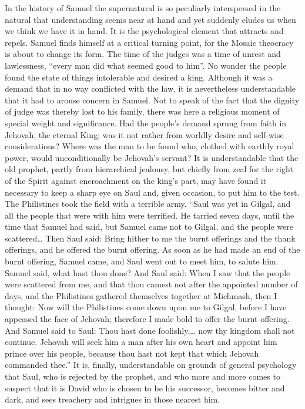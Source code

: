\documentclass[12pt,a4paper,openany]{book}
\newcommand{\opage}[1]{\marginnote{\footnotesize\textit{[#1]}}}
\begin{document}
In the history of Samuel the supernatural is so peculiarly
interspersed in the natural that understanding
seems near at hand and yet suddenly eludes us when we
think we have it in hand. It is the psychological element
that attracts and repels. Samuel finds himself at a
critical turning point, for the Mosaic theocracy is
about to change its form. The time of the judges was a
time of unrest and lawlessness, ``every man did
what seemed good to him''. No wonder the people found
the state of things intolerable and desired a king. Although
it was a demand that in no way conflicted with
the law, it is nevertheless understandable that it had to arouse
concern in Samuel. Not to speak of the fact that the dignity of judge
was thereby lost to his family, there was
here a religious moment of special weight and significance.
Had the people's demand sprung from faith in Jehovah,
the eternal King; was it not rather from worldly desire
and self-wise considerations? Where was the man to be found who,
clothed with earthly royal power, would unconditionally be
Jehovah's servant? It is understandable that the old
prophet, partly from hierarchical jealousy, but chiefly from zeal
\setcounter{footnote}{0}%
\opage{33}for the right of the Spirit against encroachment on the king's part, may
have found it necessary to keep a sharp eye on
Saul and, given occasion, to put him to the test.
The Philistines took the field with a terrible army.
``Saul was yet in Gilgal, and all the people that were with
him were terrified. He tarried seven days, until the
time that Samuel had said, but Samuel came not to
Gilgal, and the people were scattered\dots{} Then Saul said: Bring
hither to me the burnt offerings and the thank offerings, and he offered
the burnt offering. As soon as he had made an end of the burnt offering,
Samuel came, and Saul went out to meet him, to
salute him. Samuel said, what hast thou done? And Saul
said: When I saw that the people were scattered from me,
and that thou camest not after the appointed number of days, and
the Philistines gathered themselves together at Michmash, then I thought: Now
will the Philistines come down upon me to Gilgal, before
I have appeased the face of Jehovah; therefore I made bold
to offer the burnt offering. And Samuel said to
Saul: Thou hast done foolishly,\dots{} now thy kingdom shall
not continue. Jehovah will seek him a man after
his own heart and appoint him prince over his people,
because thou hast not kept that which Jehovah commanded thee.''
It is, finally, understandable on grounds of general psychology
that Saul, who is rejected by the prophet, and who
more and more comes to suspect that it is David who
is chosen to be his successor, becomes bitter and
dark, and sees treachery and intrigues in those
nearest him.
\end{document}
